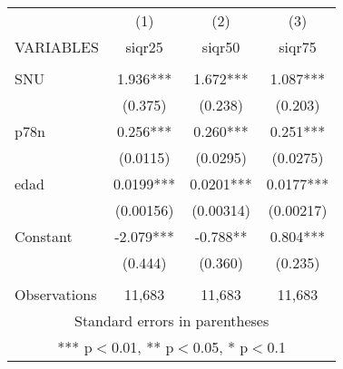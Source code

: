 \begin{tabular}{lccc} \hline
 & (1) & (2) & (3) \\
VARIABLES & siqr25 & siqr50 & siqr75 \\ \hline
 &  &  &  \\
SNU & 1.936*** & 1.672*** & 1.087*** \\
 & (0.375) & (0.238) & (0.203) \\
p78n & 0.256*** & 0.260*** & 0.251*** \\
 & (0.0115) & (0.0295) & (0.0275) \\
edad & 0.0199*** & 0.0201*** & 0.0177*** \\
 & (0.00156) & (0.00314) & (0.00217) \\
Constant & -2.079*** & -0.788** & 0.804*** \\
 & (0.444) & (0.360) & (0.235) \\
 &  &  &  \\
 Observations & 11,683 & 11,683 & 11,683 \\ \hline
\multicolumn{4}{c}{ Standard errors in parentheses} \\
\multicolumn{4}{c}{ *** p$<$0.01, ** p$<$0.05, * p$<$0.1} \\
\end{tabular}
